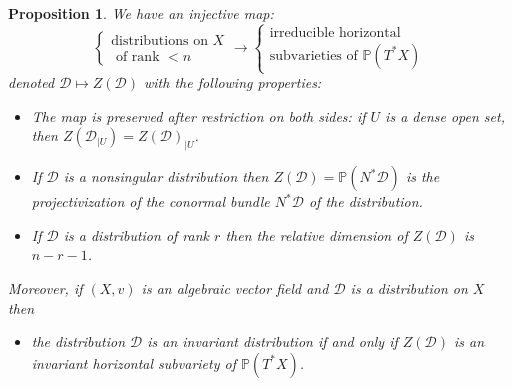 \documentclass[12pt]{amsart}
\renewcommand{\P}{\mathbb{P}}
\theoremstyle{definition}
\theoremstyle{plain}
\newtheorem{proposition}[definition]{Proposition}
\theoremstyle{exampstyle}
\theoremstyle{exampstyle}\newtheorem{thmxbis}{Theorem}
\numberwithin{equation}{section}
\theoremstyle{remark}
\begin{document}
\begin{proposition}\label{proposition-distributions-horizontal} 
We have an injective map: 
$$
\begin{cases} 
 \text{distributions on } X \\
 \text{ of rank  }< n 
 \end{cases} \rightarrow \begin{cases} 
  \text{irreducible horizontal} \\
 \text{subvarieties of } \P(T^\ast X) 
 \end{cases} $$
denoted $\mathcal D \mapsto Z(\mathcal D)$ with the following properties: 
\begin{itemize} 
\item[(i)] The map is preserved after restriction on both sides: if $U$ is a dense open set, then $Z(\mathcal {D}_{\mid U}) = Z(\mathcal D)_{\mid U}$.  
\item[(ii)] If $\mathcal D$ is a nonsingular distribution then $Z(\mathcal D) = \P(N^\ast \mathcal D)$
is the projectivization of the conormal bundle $N^\ast \mathcal D$ of the distribution. 
\item[(iii)] If $\mathcal D$ is a distribution of rank $r$ then the relative dimension of $Z(\mathcal D)$ is $n - r - 1$.
\end{itemize} 
Moreover, if $(X,v)$ is an algebraic vector field and $\mathcal D$ is a distribution on $X$ then 
\begin{itemize} 
\item[(iv)] the distribution $\mathcal D$ is an invariant distribution if and only if  $Z(\mathcal D)$ is an invariant horizontal subvariety of $\P(T^\ast X)$. 
\end{itemize} 
\end{proposition} 
\end{document}
